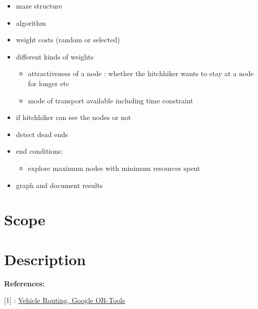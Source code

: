 \documentclass[
]{article}
\begin{document}
\begin{itemize}
\item
  maze structure
\item
  algorithm
\item
  weight costs (random or selected)
\item
  different kinds of weights

  \begin{itemize}
  \item
    attractiveness of a node : whether the hitchhiker wants to stay at a
    node for longer etc
  \item
    mode of transport available including time constraint
  \end{itemize}
\item
  if hitchhiker can see the nodes or not
\item
  detect dead ends
\item
  end conditions:

  \begin{itemize}
  \item
    explore maximum nodes with minimum resources spent
  \end{itemize}
\item
  graph and document results
\end{itemize}

\section{Scope}\label{scope}

\section{Description}\label{description}

\textbf{References:}

{[}1{]} :
\href{https://developers.google.com/optimization/routing}{Vehicle
Routing, Google OR-Tools}
\end{document}
